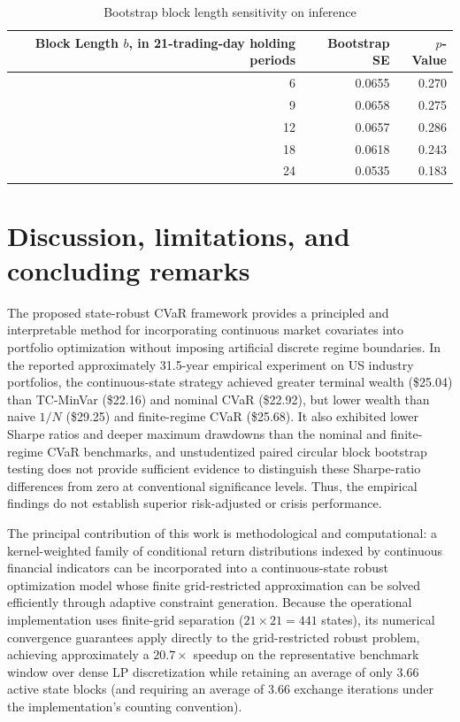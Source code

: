 \documentclass[11pt, a4paper]{article}
\begin{document}
\begin{table}[htbp]
\centering
\caption{Bootstrap block length sensitivity on inference}
\label{tab:sens_block}
\begin{tabular}{rrr}
\toprule
\textbf{Block Length $b$, in 21-trading-day holding periods} & \textbf{Bootstrap SE} & \textbf{$p$-Value} \\
\midrule
6 & 0.0655 & 0.270 \\
9 & 0.0658 & 0.275 \\
12 & 0.0657 & 0.286 \\
18 & 0.0618 & 0.243 \\
24 & 0.0535 & 0.183 \\
\bottomrule
\end{tabular}
\end{table}

\section{Discussion, limitations, and concluding remarks}
The proposed state-robust CVaR framework provides a principled and interpretable method for incorporating continuous market covariates into portfolio optimization without imposing artificial discrete regime boundaries. In the reported approximately 31.5-year empirical experiment on US industry portfolios, the continuous-state strategy achieved greater terminal wealth (\$25.04) than TC-MinVar (\$22.16) and nominal CVaR (\$22.92), but lower wealth than naive $1/N$ (\$29.25) and finite-regime CVaR (\$25.68). It also exhibited lower Sharpe ratios and deeper maximum drawdowns than the nominal and finite-regime CVaR benchmarks, and unstudentized paired circular block bootstrap testing does not provide sufficient evidence to distinguish these Sharpe-ratio differences from zero at conventional significance levels. Thus, the empirical findings do not establish superior risk-adjusted or crisis performance.

The principal contribution of this work is methodological and computational: a kernel-weighted family of conditional return distributions indexed by continuous financial indicators can be incorporated into a continuous-state robust optimization model whose finite grid-restricted approximation can be solved efficiently through adaptive constraint generation. Because the operational implementation uses finite-grid separation ($21\times21 = 441$ states), its numerical convergence guarantees apply directly to the grid-restricted robust problem, achieving approximately a $20.7\times$ speedup on the representative benchmark window over dense LP discretization while retaining an average of only 3.66 active state blocks (and requiring an average of 3.66 exchange iterations under the implementation's counting convention).
\end{document}
